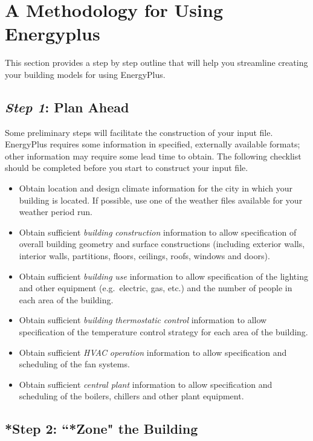 \section{A Methodology for Using Energyplus}\label{a-methodology-for-using-energyplus}

This section provides a step by step outline that will help you streamline creating your building models for using EnergyPlus.

\subsection{\emph{Step 1}: Plan Ahead}\label{step-1-plan-ahead}

Some preliminary steps will facilitate the construction of your input file. EnergyPlus requires some information in specified, externally available formats; other information may require some lead time to obtain. The following checklist should be completed before you start to construct your input file.

\begin{itemize}
\item
  Obtain location and design climate information for the city in which your building is located. If possible, use one of the weather files available for your weather period run.
\item
  Obtain sufficient \emph{building} \emph{construction} information to allow specification of overall building geometry and surface constructions (including exterior walls, interior walls, partitions, floors, ceilings, roofs, windows and doors).
\item
  Obtain sufficient \emph{building} \emph{use} information to allow specification of the lighting and other equipment (e.g.~electric, gas, etc.) and the number of people in each area of the building.
\item
  Obtain sufficient \emph{building} \emph{thermostatic} \emph{control} information to allow specification of the temperature control strategy for each area of the building.
\item
  Obtain sufficient \emph{HVAC} \emph{operation} information to allow specification and scheduling of the fan systems.
\item
  Obtain sufficient \emph{central plant} information to allow specification and scheduling of the boilers, chillers and other plant equipment.
\end{itemize}

\subsection{*Step 2: ``*Zone" the Building}\label{step-2-zone-the-building}

